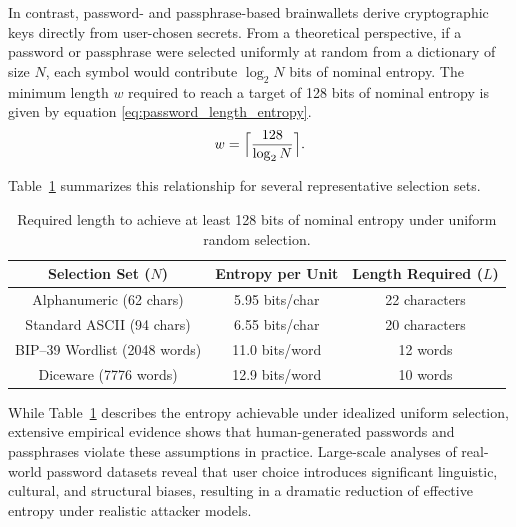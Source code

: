 \documentclass[journal,article,accept,pdftex,moreauthors]{Definitions/mdpi}
\begin{document}
In contrast, password- and passphrase-based brainwallets derive cryptographic keys directly from user-chosen secrets. From a theoretical perspective, if a password or passphrase were selected uniformly at random from a dictionary of size $N$, each symbol would contribute $\log_2 N$ bits of nominal entropy. The minimum length $w$ required to reach a target of 128 bits of nominal entropy is given by equation \ref{eq:password_length_entropy}.
\begin{equation}
w = \Bigl\lceil \frac{128}{\log_2 N} \Bigr\rceil .
\label{eq:password_length_entropy}
\end{equation}


Table~\ref{tab:words_for_entropy} summarizes this relationship for several representative selection sets.

\begin{table}[H]
\caption{Required length to achieve at least 128 bits of nominal entropy under uniform random selection.}
\label{tab:words_for_entropy}
\centering
\begin{tabular}{ccc}
\toprule
\textbf{Selection Set ($N$)} & \textbf{Entropy per Unit} & \textbf{Length Required ($L$)} \\
\midrule
Alphanumeric (62 chars)      & 5.95 bits/char           & 22 characters                  \\
Standard ASCII (94 chars)    & 6.55 bits/char           & 20 characters                  \\
BIP--39 Wordlist (2048 words) & 11.0 bits/word           & 12 words                       \\
Diceware (7776 words)        & 12.9 bits/word           & 10 words                       \\
\bottomrule
\end{tabular}
\end{table}

While Table~\ref{tab:words_for_entropy} describes the entropy achievable under idealized uniform selection, extensive empirical evidence shows that human-generated passwords and passphrases violate these assumptions in practice. Large-scale analyses of real-world password datasets reveal that user choice introduces significant linguistic, cultural, and structural biases, resulting in a dramatic reduction of effective entropy under realistic attacker models.
\end{document}
